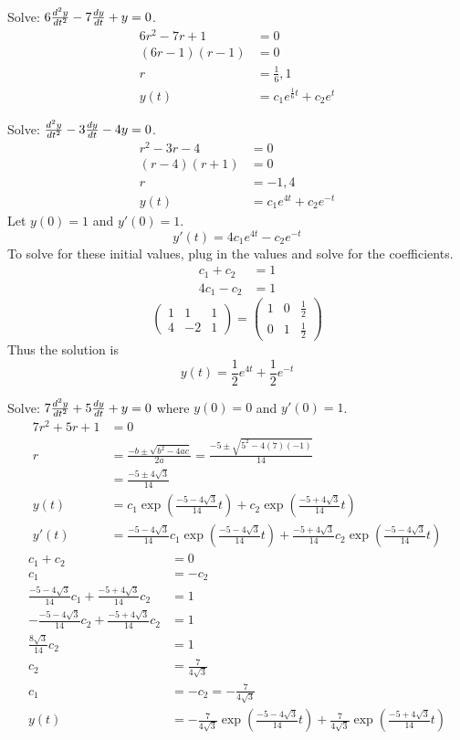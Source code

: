 \documentclass[12pt]{article}
\begin{document}
\begin{example} Solve: $6\frac{d^2y}{dt^2} - 7\frac{dy}{dt}+ y = 0$. $$\begin{aligned} 6r^2 - 7r + 1 &= 0 \\ (6r - 1)(r - 1) &= 0 \\ r &= \frac{1}{6}, 1 \\ y(t) &= c_1e^{\frac{1}{6}t} + c_2e^t \end{aligned} $$ \end{example} 
\begin{example} Solve: $\frac{d^2y}{dt^2} - 3\frac{dy}{dt}- 4y = 0$. $$\begin{aligned} r^2 - 3r - 4 &= 0 \\ (r - 4)(r + 1) &= 0 \\ r &= -1, 4 \\ y(t) &= c_1e^{4t} + c_2e^{-t} \end{aligned} $$ Let $y(0) = 1$ and $y'(0) = 1$. $$y'(t) = 4c_1e^{4t} - c_2e^{-t} $$ To solve for these initial values, plug in the values and solve for the coefficients. $$\begin{aligned} c_1 + c_2 &= 1 \\ 4c_1 - c_2 &= 1 \end{aligned} $$ $$\begin{pmatrix} 1 & 1 & 1 \\ 4 & -2 & 1 \end{pmatrix} = \begin{pmatrix} 1 & 0 & \frac{1}{2} \\ 0 & 1 & \frac{1}{2} \end{pmatrix} $$ Thus the solution is
$$ y(t) = \frac{1}{2}e^{4t} + \frac{1}{2}e^{-t} $$ \end{example} 
\begin{example} Solve: $7\frac{d^2y}{dt^2} + 5\frac{dy}{dt}+ y = 0$ where $y(0) = 0$ and $y'(0) = 1$. $$\begin{aligned} 7r^2 + 5r + 1 &= 0 \\ r &= \frac{-b \pm \sqrt{b^2 - 4ac}}{2a} = \frac{-5 \pm \sqrt{5^2 - 4(7)(-1)}}{14} \\ &= \frac{-5 \pm 4 \sqrt{3}}{14} \\ y(t) &= c_1\exp(\frac{-5 - 4\sqrt{3}}{14}t) + c_2\exp(\frac{-5 + 4\sqrt{3}}{14}t) \\ y'(t) &= \frac{-5 - 4\sqrt{3}}{14}c_1\exp(\frac{-5 - 4\sqrt{3}}{14}t) + \frac{-5 + 4\sqrt{3}}{14}c_2\exp(\frac{-5 - 4\sqrt{3}}{14}t) \end{aligned} $$  $$\begin{aligned} c_1 + c_2 &= 0 \\  c_1 &= -c_2 \\ \frac{-5 - 4\sqrt{3}}{14}c_1 + \frac{-5 + 4\sqrt{3}}{14}c_2 &= 1 \\ -\frac{-5 - 4\sqrt{3}}{14}c_2 + \frac{-5 + 4\sqrt{3}}{14}c_2 &= 1 \\ \frac{8\sqrt{3}}{14}c_2 &= 1 \\ c_2 &= \frac{7}{4\sqrt{3}} \\ c_1 &= -c_2 = -\frac{7}{4\sqrt{3}} \\ y(t) &= -\frac{7}{4\sqrt{3}}\exp(\frac{-5 - 4\sqrt{3}}{14}t) + \frac{7}{4\sqrt{3}}\exp(\frac{-5 + 4\sqrt{3}}{14}t)  \end{aligned} $$ \end{example} 
\end{document}
